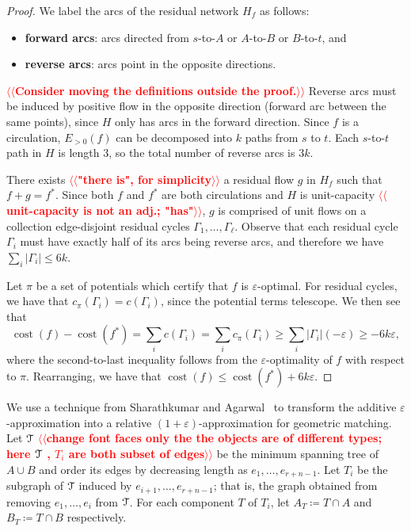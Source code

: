 \documentclass[11pt]{article}
\makeatletter
\def\eps{\varepsilon}
\theoremstyle{plain}
\newtheorem{corollary}[lemma]{Corollary}
\numberwithin{figure}{section}
\def\cost{\operatorname{cost}}
\def\EMPH#1{\textbf{\boldmath #1}}
\def\n@te#1{\textsf{\boldmath \textbf{$\langle\!\langle$#1$\rangle\!\rangle$}}\leavevmode}
\def\note#1{\textcolor{red}{\n@te{#1}}}
\makeatother
\begin{document}
\begin{proof}
We label the arcs of the residual network $H_f$ as follows:
\begin{itemize}\itemsep=0pt
\item \EMPH{forward arcs}: arcs directed from $s$-to-$A$ or $A$-to-$B$ or
	$B$-to-$t$, and
\item \EMPH{reverse arcs}: arcs point in the opposite directions.
\end{itemize}
\note{Consider moving the definitions outside the proof.}
Reverse arcs must be induced by positive flow in the opposite direction
(forward arc between the same points), since $H$ only has arcs in the forward
direction.
Since $f$ is a circulation, $E_{>0}(f)$ can be decomposed into $k$ paths from
$s$ to $t$.
Each $s$-to-$t$ path in $H$ is length 3, so the total number of reverse arcs
is $3k$.

There exists \note{"there is", for simplicity} a residual flow $g$ in $H_f$ such that $f + g = f^*$.
Since both $f$ and $f^*$ are both circulations and $H$ is unit-capacity \note{unit-capacity is not an adj.; "has"}, $g$ is
comprised of unit flows on a collection edge-disjoint residual cycles
$\Gamma_1, \ldots, \Gamma_\ell$.
Observe that each residual cycle $\Gamma_i$ must have exactly half of its arcs
being reverse arcs, and therefore we have $\sum_i |\Gamma_i| \leq 6k$.

Let $\pi$ be a set of potentials which certify that $f$ is $\eps$-optimal.
For residual cycles, we have that $c_\pi(\Gamma_i) = c(\Gamma_i)$, since the
potential terms telescope.
We then see that
\begin{equation*}
	\cost(f) - \cost(f^*)
	= \sum_i c(\Gamma_i)
	= \sum_i c_\pi(\Gamma_i)
	\geq \sum_i |\Gamma_i|(-\eps)
	\geq -6k\eps,
\end{equation*}
where the second-to-last inequality follows from the $\eps$-optimality of $f$
with respect to $\pi$.
Rearranging, we have that $\cost(f) \leq \cost(f^*) + 6k\eps$.
\end{proof}


We use a technique from Sharathkumar and Agarwal~\cite{SA12} to transform the
additive $\eps$-approximation into a relative $(1+\eps)$-approximation
for geometric matching.
Let $\EuScript{T}$ \note{change font faces only the the objects are of different types; here $\EuScript{T}$ , $T_i$ are both subset of edges} be the minimum spanning tree of $A \cup B$ and order
its edges by decreasing length as $e_1, \ldots, e_{r+n-1}$.
Let $T_i$ be the subgraph of $\EuScript{T}$ induced by
$e_{i+1}, \ldots, e_{r+n-1}$; that is, the graph obtained from removing $e_1,\ldots,e_i$ from $\EuScript{T}$.
For each component $T$ of $T_i$, let $A_T \coloneqq T \cap A$ and $B_T \coloneqq T \cap B$
respectively.
\end{document}
